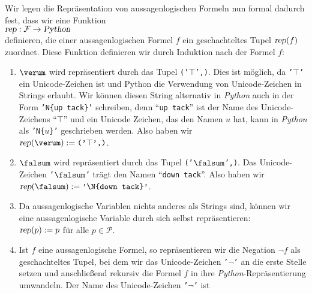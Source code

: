 Wir legen die Repräsentation von aussagenlogischen Formeln nun formal dadurch fest, dass wir eine Funktion
\\[0.2cm]
\hspace*{1.3cm}
$\textsl{rep}: \mathcal{F} \rightarrow \textsl{Python}$
\\[0.2cm]
definieren, die einer aussagenlogischen Formel $f$ ein geschachteltes Tupel 
$\textsl{rep}(f)$ zuordnet.  Diese Funktion definieren wir durch Induktion nach der Formel $f$:
\begin{enumerate}
\item $\verum$ wird repräsentiert durch das Tupel \texttt{('$\top$',)}.
      Dies ist möglich, da \texttt{'$\top$'} ein Unicode-Zeichen ist und Python die Verwendung von
      Unicode-Zeichen in Strings erlaubt.  Wir können diesen String alternativ in \textsl{Python} 
      auch in der Form
      \texttt{'N\{up tack\}'} schreiben, denn ``\texttt{up tack}'' ist der Name des
      Unicode-Zeichens ``$\top$'' und ein Unicode Zeichen, das den Namen $u$ hat, kann in \textsl{Python}
      als \texttt{'N\{$u$\}'} geschrieben werden.  Also haben wir
      \\[0.2cm]
      \hspace*{1.3cm}
      $\textsl{rep}(\verum) := \texttt{('$\top$',)}$.
\item $\falsum$  wird repräsentiert durch das Tupel \texttt{('$\falsum$',)}.
      Das Unicode-Zeichen \texttt{'$\falsum$'} trägt den Namen \linebreak
      ``\texttt{down tack}''.
      Also haben wir
      \\[0.2cm]
      \hspace*{1.3cm}
      $\textsl{rep}(\falsum) := \texttt{'\symbol{92}N\{down tack\}'}$.
\item Da aussagenlogische Variablen nichts anderes als Strings sind, können wir eine aussagen\-logische Variable
      durch sich selbst repräsentieren:
      \\[0.2cm]
      \hspace*{1.3cm}
      $\textsl{rep}(p) := p$ \quad für alle $p \in \mathcal{P}$.
\item Ist $f$ eine aussagenlogische Formel, so repräsentieren wir die Negation $\neg f$ als geschachteltes Tupel,
      bei dem wir das Unicode-Zeichen \texttt{'$\neg$'} an die erste Stelle setzen und anschließend
      rekursiv die Formel $f$ in ihre \textsl{Python}-Repräsentierung umwandeln.
      Der Name des Unicode-Zeichen \texttt{'$\neg$'} ist 

\end{enumerate}

